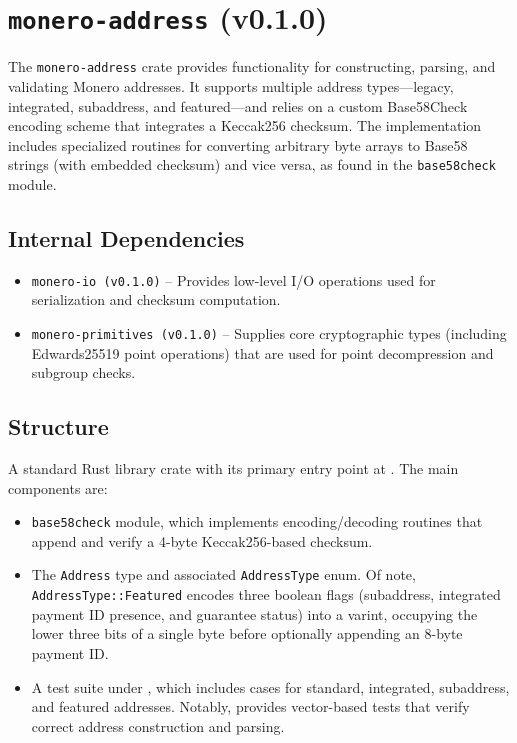 \documentclass[12pt,a4paper]{article}
\begin{document}



\section{\texttt{monero-address} (v0.1.0)}
The \texttt{monero-address} crate provides functionality for constructing, parsing, and validating Monero addresses. It supports multiple address types---legacy, integrated, subaddress, and featured---and relies on a custom Base58Check encoding scheme that integrates a Keccak256 checksum. The implementation includes specialized routines for converting arbitrary byte arrays to Base58 strings (with embedded checksum) and vice versa, as found in the \texttt{base58check} module.

\subsection{Internal Dependencies}
\begin{itemize}
    \item \texttt{monero-io (v0.1.0)} -- Provides low-level I/O operations used for serialization and checksum computation.
    \item \texttt{monero-primitives (v0.1.0)} -- Supplies core cryptographic types (including Edwards25519 point operations) that are used for point decompression and subgroup checks.
\end{itemize}

\subsection{Structure}
A standard Rust library crate with its primary entry point at . The main components are:
\begin{itemize}
    \item \texttt{base58check} module, which implements encoding/decoding routines that append and verify a 4-byte Keccak256-based checksum.
    \item The \texttt{Address} type and associated \texttt{AddressType} enum. Of note, \texttt{AddressType::Featured} encodes three boolean flags (subaddress, integrated payment ID presence, and guarantee status) into a varint, occupying the lower three bits of a single byte before optionally appending an 8-byte payment ID.
    \item A test suite under , which includes cases for standard, integrated, subaddress, and featured addresses. Notably,  provides vector-based tests that verify correct address construction and parsing.
\end{itemize}
\end{document}
